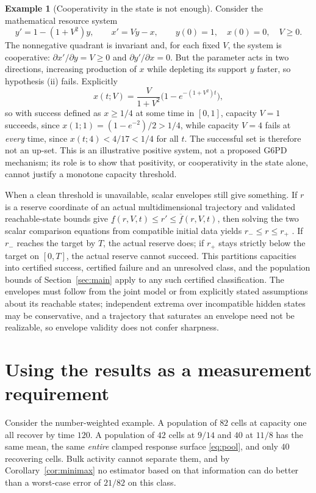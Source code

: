 \documentclass[11pt]{article}
\theoremstyle{definition}
\newtheorem{example}[theorem]{Example}
\begin{document}
\begin{example}[Cooperativity in the state is not enough]\label{ex:counter}
Consider the mathematical resource system
\begin{equation}\label{eq:counter}
  y'=1-(1+V^2)y,\qquad x'=Vy-x,\qquad y(0)=1,\quad x(0)=0,\quad V\ge0 .
\end{equation}
The nonnegative quadrant is invariant and, for each fixed $V$, the system is
cooperative: $\partial x'/\partial y=V\ge0$ and $\partial y'/\partial x=0$. But
the parameter acts in two directions, increasing production of $x$ while
depleting its support $y$ faster, so hypothesis (ii) fails. Explicitly
\begin{equation}\label{eq:counter-solution}
  x(t;V)=\frac V{1+V^2}\Big(1-e^{-(1+V^2)t}\Big),
\end{equation}
so with success defined as $x\ge1/4$ at some time in $[0,1]$, capacity $V=1$
succeeds, since $x(1;1)=(1-e^{-2})/2>1/4$, while capacity $V=4$ fails at
\emph{every} time, since $x(t;4)<4/17<1/4$ for all $t$. The successful set is
therefore not an up-set. This is an illustrative positive system, not a
proposed G6PD mechanism; its role is to show that positivity, or
cooperativity in the state alone, cannot justify a monotone capacity
threshold.
\end{example}

When a clean threshold is unavailable, scalar envelopes still give something.
If $r$ is a reserve coordinate of an actual multidimensional trajectory and
validated reachable-state bounds give
$\underline f(r,V,t)\le r'\le\overline f(r,V,t)$, then solving the two scalar
comparison equations from compatible initial data yields $r_-\le r\le r_+$
\cite{walter}. If $r_-$ reaches the target by $T$, the actual reserve does; if
$r_+$ stays strictly below the target on $[0,T]$, the actual reserve cannot
succeed. This partitions capacities into certified success, certified failure
and an unresolved class, and the population bounds of
Section~\ref{sec:main} apply to any such certified classification. The
envelopes must follow from the joint model or from explicitly stated
assumptions about its reachable states; independent extrema over incompatible
hidden states may be conservative, and a trajectory that saturates an envelope
need not be realizable, so envelope validity does not confer sharpness.

\section{Using the results as a measurement requirement}\label{sec:use}
Consider the number-weighted example. A population of $82$ cells at capacity
one all recover by time $120$. A population of $42$ cells at $9/14$ and $40$
at $11/8$ has the same mean, the same \emph{entire} clamped response surface
\eqref{eq:pool}, and only $40$ recovering cells. Bulk activity cannot separate
them, and by Corollary~\ref{cor:minimax} no estimator based on that
information can do better than a worst-case error of $21/82$ on this class.
\end{document}
